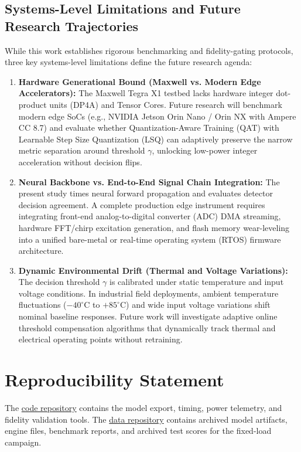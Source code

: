 \documentclass[11pt,a4paper]{article}
\begin{document}
\subsection{Systems-Level Limitations and Future Research Trajectories}
While this work establishes rigorous benchmarking and fidelity-gating protocols, three key systems-level limitations define the future research agenda:
\begin{enumerate}
    \item \textbf{Hardware Generational Bound (Maxwell vs. Modern Edge Accelerators):} The Maxwell Tegra X1 testbed lacks hardware integer dot-product units (DP4A) and Tensor Cores. Future research will benchmark modern edge SoCs (e.g., NVIDIA Jetson Orin Nano / Orin NX with Ampere CC 8.7) and evaluate whether Quantization-Aware Training (QAT) with Learnable Step Size Quantization (LSQ) can adaptively preserve the narrow metric separation around threshold $\gamma$, unlocking low-power integer acceleration without decision flips.
    \item \textbf{Neural Backbone vs. End-to-End Signal Chain Integration:} The present study times neural forward propagation and evaluates detector decision agreement. A complete production edge instrument requires integrating front-end analog-to-digital converter (ADC) DMA streaming, hardware FFT/chirp excitation generation, and flash memory wear-leveling into a unified bare-metal or real-time operating system (RTOS) firmware architecture.
    \item \textbf{Dynamic Environmental Drift (Thermal and Voltage Variations):} The decision threshold $\gamma$ is calibrated under static temperature and input voltage conditions. In industrial field deployments, ambient temperature fluctuations ($ -40^\circ\text{C}$ to $+85^\circ\text{C}$) and wide input voltage variations shift nominal baseline responses. Future work will investigate adaptive online threshold compensation algorithms that dynamically track thermal and electrical operating points without retraining.
\end{enumerate}

\section{Reproducibility Statement}
\label{sec:reproducibility}

The \href{https://github.com/igmsalinas/fault-converters-code/tree/9e13ccdd263346e2eadd15102fe096393a64d38a}{code repository} contains the model export, timing, power telemetry, and fidelity validation tools. The \href{https://github.com/igmsalinas/fault-converters-data/tree/4950ecf604fab8b63395201b2d4a28af88fae8e8}{data repository} contains archived model artifacts, engine files, benchmark reports, and archived test scores for the fixed-load campaign.
\end{document}
